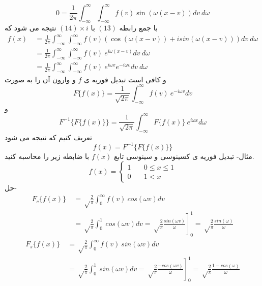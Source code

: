 \begin{equation}
	0= \frac{1}{2\pi}\int_{-{\infty}}^{{\infty}}\int_{-{\infty}}^{{\infty}} f(v)\sin(  \omega(x-v) ) d v \ d\omega
\end{equation}
با جمع رابطه
$(13)$
با
$(14)\times i$
نتیجه می شود که
\begin{equation*}
	\begin{aligned}
		f(x) {} &\
		= \frac{1}{2\pi}\int_{-{\infty}}^{{\infty}}\int_{-{\infty}}^{{\infty}} f(v)(\cos(\omega(x-v)) +isin(  \omega(x-v)) ) d v \ d\omega
		\\ &\
		=\frac{1}{2\pi}\int_{-{\infty}}^{{\infty}}\int_{-{\infty}}^{{\infty}} f(v) \ e^{i\omega(x-v)} d v \ d\omega
		\\ &\
		=\frac{1}{2\pi}\int_{-{\infty}}^{{\infty}}\int_{-{\infty}}^{{\infty}} f(v) \ e^{i\omega x} e^{-i\omega v} d v \ d\omega
	\end{aligned}
\end{equation*}
و کافی است تبدیل فوریه ی
$f$
و وارون آن را به صورت
\[
F\{f(x)\}=\frac{1} {\sqrt{2\pi}}\int_{-{\infty}}^{{\infty}} f(v) \ e^{-i\omega v} d v
\]
و
\[
F^{-1}\{F\{f(x)\}\}=\frac{1} {\sqrt{2\pi}}\int_{-{\infty}}^{{\infty}}F\{f(x)\} \ e^{i\omega x} d \omega
\]
تعریف کنیم که نتیجه می شود
\[
f(x)=F^{-1}\{F\{f(x)\}\}
\]
مثال- تبدیل فوریه ی کسینوسی و سینوسی تابع 
$f(x)$
با ضابطه زیر را محاسبه کنید.
\[
f(x) =
\begin{cases}
	1       & \quad 0\le x\le 1 \\
	0  & \quad 1<x
\end{cases}
\]
حل-
\begin{equation*}
	\begin{aligned}
		F_{c}\{f(x)\} {} &\
		=\sqrt \frac{2}{\pi}\int_{0}^{{\infty}} f(v)\ cos(\omega v)  d v
		\\ &\
		=\sqrt \frac{2}{\pi}\int_{0}^{1}\ cos(\omega v)  d v=\left.\sqrt \frac{2}{\pi}\frac{ sin(\omega v)}{\omega} \right]_{0}^{1}=\sqrt \frac{2}{\pi}\frac{ sin(\omega )}{\omega}
	\end{aligned}
\end{equation*}
\begin{equation*}
	\begin{aligned}
		F_{s}\{f(x)\} {} &\
		=\sqrt \frac{2}{\pi}\int_{0}^{{\infty}} f(v)\ sin(\omega v)  d v
		\\ &\
		=\sqrt \frac{2}{\pi}\int_{0}^{1}\ sin(\omega v)  d v=\left.\sqrt \frac{2}{\pi}\frac{ -cos(\omega v)}{\omega} \right]_{0}^{1}=\sqrt \frac{2}{\pi}\frac{1- cos(\omega )}{\omega}
	\end{aligned}
\end{equation*}
